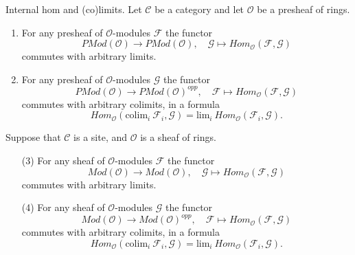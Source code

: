 \begin{lemma}
\label{lemma-internal-hom-commute-limits}
Internal hom and (co)limits.
Let $\mathcal{C}$ be a category and let $\mathcal{O}$ be a presheaf of rings.
\begin{enumerate}
\item For any presheaf of $\mathcal{O}$-modules $\mathcal{F}$ the functor
$$
\textit{PMod}(\mathcal{O}) \longrightarrow \textit{PMod}(\mathcal{O})
,\quad
\mathcal{G} \longmapsto \textit{Hom}_{\mathcal{O}}(\mathcal{F}, \mathcal{G})
$$
commutes with arbitrary limits.
\item For any presheaf of $\mathcal{O}$-modules $\mathcal{G}$ the functor
$$
\textit{PMod}(\mathcal{O}) \longrightarrow \textit{PMod}(\mathcal{O})^{opp}
,\quad
\mathcal{F} \longmapsto \textit{Hom}_{\mathcal{O}}(\mathcal{F}, \mathcal{G})
$$
commutes with arbitrary colimits, in a formula
$$
\textit{Hom}_{\mathcal{O}}(\text{colim}_i\ \mathcal{F}_i, \mathcal{G})
=
\text{lim}_i\ \textit{Hom}_{\mathcal{O}}(\mathcal{F}_i, \mathcal{G}).
$$
\end{enumerate}
Suppose that $\mathcal{C}$ is a site, and $\mathcal{O}$ is a sheaf of rings.
\begin{enumerate}
\item[(3)] For any sheaf of $\mathcal{O}$-modules $\mathcal{F}$ the functor
$$
\textit{Mod}(\mathcal{O}) \longrightarrow \textit{Mod}(\mathcal{O})
,\quad
\mathcal{G} \longmapsto \textit{Hom}_{\mathcal{O}}(\mathcal{F}, \mathcal{G})
$$
commutes with arbitrary limits.
\item[(4)] For any sheaf of $\mathcal{O}$-modules $\mathcal{G}$ the functor
$$
\textit{Mod}(\mathcal{O}) \longrightarrow \textit{Mod}(\mathcal{O})^{opp}
,\quad
\mathcal{F} \longmapsto \textit{Hom}_{\mathcal{O}}(\mathcal{F}, \mathcal{G})
$$
commutes with arbitrary colimits, in a formula
$$
\textit{Hom}_{\mathcal{O}}(\text{colim}_i\ \mathcal{F}_i, \mathcal{G})
=
\text{lim}_i\ \textit{Hom}_{\mathcal{O}}(\mathcal{F}_i, \mathcal{G}).
$$
\end{enumerate}
\end{lemma}

